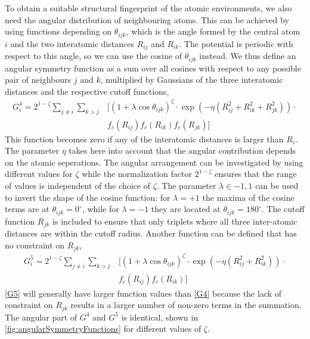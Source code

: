 \documentclass[twoside,english]{uiofysmaster}
\begin{document}
To obtain a suitable structural fingerprint of the atomic environments, we also need the angular distribution
of neighbouring atoms. This can be achieved by using functions depending on $\theta_{ijk}$, which
is the angle formed by the central atom $i$ and the two interatomic distances $R_{ij}$ and $R_{ik}$. 
The potential is periodic with respect to this angle, so we can use the cosine of $\theta_{ijk}$ instead. 
We thus define an angular symmetry function as a sum over all cosines with respect to any possible pair of 
neighbours $j$ and $k$, multiplied by Gaussians of the three interatomic distances and the respective cutoff functions,
\begin{align}
 G_i^4 = 2^{1-\zeta}\sum_{j\neq i}\sum_{k>j} &[(1 + \lambda \cos\theta_{ijk})^\zeta \cdot
 \exp(-\eta (R_{ij}^2 + R_{ik}^2 + R_{jk}^2)) \cdot \\
 &f_c(R_{ij}) f_c(R_{ik}) f_c (R_{jk})]
 \label{G4}
\end{align}
This function becomes zero if any of the interatomic distances is larger than $R_c$. The parameter $\eta$ takes here
into account that the angular contribution depends on the atomic seperations. The angular arrangement can be 
investigated by using different values for $\zeta$ while the normalization factor $2^{1-\zeta}$ ensures that the range of 
values is independent of the choice of $\zeta$. The parameter $\lambda \in {-1,1}$ can be used to invert the shape of the 
cosine function: for $\lambda = +1$ the maxima of the cosine terms are at $\theta_{ijk} = 0^\circ$, 
while for $\lambda=-1$ they are located at $\theta_{ijk} = 180^\circ$. The cutoff function $R_{jk}$
is included to ensure that only triplets where all three inter-atomic distances are within the cutoff radius. 
Another function can be defined that has no constraint on $R_{jk}$,
\begin{align}
  G_i^5 = 2^{1-\zeta}\sum_{j\neq i}\sum_{k>j} &[(1 + \lambda \cos\theta_{ijk})^\zeta \cdot
 \exp(-\eta (R_{ij}^2 + R_{ik}^2)) \cdot \\
 &f_c(R_{ij}) f_c(R_{ik})]
 \label{G5}
\end{align}
\eqref{G5} will generally have larger function values than \eqref{G4} because the lack of constraint on $R_{jk}$ results in 
a larger number of non-zero terms in the summation. The angular part of $G^4$ and $G^5$ is identical, shown in 
\autoref{fig:angularSymmetryFunctions} for different values of $\zeta$. 
\end{document}
